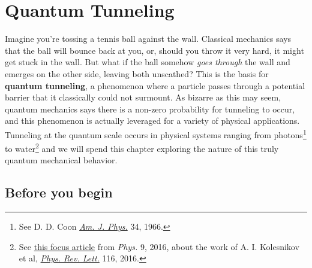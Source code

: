 

%

\chapter{Quantum Tunneling} \label{ch:tunnel}
Imagine you're tossing a tennis ball against the wall. 
Classical mechanics says that the ball will bounce back at you, or, should you throw it very hard, it might get stuck in the wall. 
But what if the ball somehow \emph{goes through} the wall and emerges on the other side, leaving both unscathed? 
This is the basis for \textbf{quantum tunneling}, a phenomenon where a particle passes through a potential barrier that it classically could not surmount. 
As bizarre as this may seem, quantum mechanics says there is a non-zero probability for tunneling to occur, and this phenomenon is actually leveraged for a variety of physical applications. 
Tunneling at the quantum scale occurs in physical systems ranging from photons\footnote{See D. D. Coon \href{http://aapt.scitation.org/doi/10.1119/1.1972893}{\emph{Am. J. Phys.}} 34, 1966.} to water\footnote{See \href{https://physics.aps.org/articles/v9/43}{this focus article} from \emph{Phys.} 9, 2016, about the work of A. I. Kolesnikov et al, \href{https://journals.aps.org/prl/abstract/10.1103/PhysRevLett.116.167802}{\emph{Phys. Rev. Lett.}} 116, 2016.} and we will spend this chapter exploring the nature of this truly quantum mechanical behavior.


\section{Before you begin}

